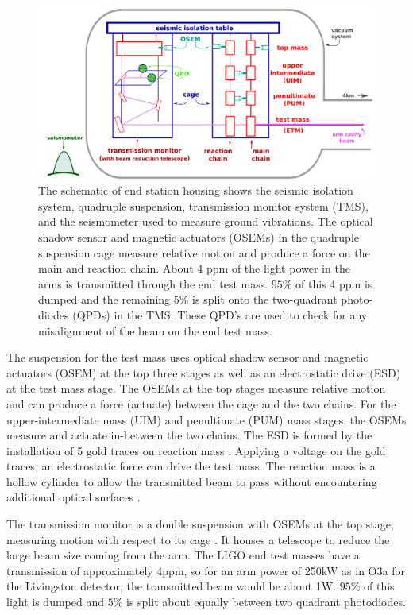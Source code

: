 \documentclass[12pt]{iopart}
\begin{document}
\begin{figure}
    \centering
    \includegraphics[width=\textwidth]{EndStationDiagram3.png}
    \caption{The schematic of end station housing shows the seismic isolation system, quadruple suspension, transmission monitor system (TMS), and the seismometer used to measure ground vibrations. The optical shadow sensor and magnetic actuators (OSEMs) in the quadruple suspension cage measure relative motion and produce a force on the main and reaction chain. About 4 ppm of the light power in the arms is transmitted through the end test mass. $95$\% of this 4 ppm is dumped and the remaining $5$\% is split onto the two-quadrant photo-diodes (QPDs) in the TMS. These QPD's are used to check for any misalignment of the beam on the end test mass. }
    \label{fig:end_station}
\end{figure}
The suspension for the test mass uses optical shadow sensor and magnetic actuators (OSEM)  at the top three stages as well as an electrostatic drive (ESD) at the test mass stage. The OSEMs at the top stages measure relative motion and can produce a force (actuate) between the cage and the two chains. For the upper-intermediate mass (UIM) and penultimate (PUM) mass stages, the OSEMs measure and actuate in-between the two chains. The ESD is formed by the installation of 5 gold traces on reaction mass \cite{esd_schematic}. Applying a voltage on the gold traces, an electrostatic force can drive the test mass.  The reaction mass is a hollow cylinder to allow the transmitted beam to pass without encountering additional optical surfaces \cite{aerm_schematic}.

The transmission monitor is a double suspension with OSEMs at the top stage, measuring motion with respect to its cage \cite{Barsotti_2010}. It houses a telescope to reduce the large beam size coming from the arm. The LIGO end test masses have a transmission of approximately 4ppm, so for an arm power of 250kW as in O3a for the Livingston detector, the transmitted beam would be about 1W. $95\%$ of this light is dumped and $5\%$ is split about equally between two quadrant photodiodes.
\end{document}
